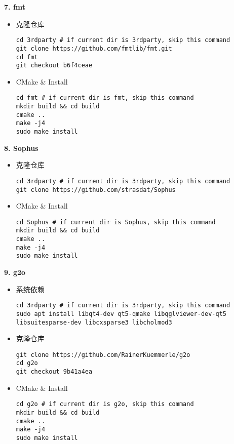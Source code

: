 \noindent \textbf{7. fmt}
\begin{itemize}[itemsep=0.1pt,topsep =2pt]
    \item 克隆仓库
\begin{lstlisting}[style=bash]
cd 3rdparty # if current dir is 3rdparty, skip this command
git clone https://github.com/fmtlib/fmt.git
cd fmt
git checkout b6f4ceae
\end{lstlisting}   
    \item CMake \& Install
\begin{lstlisting}[style=bash]
cd fmt # if current dir is fmt, skip this command
mkdir build && cd build
cmake ..
make -j4
sudo make install
\end{lstlisting}   
\end{itemize}

\noindent \textbf{8. Sophus}
\begin{itemize}[itemsep=0.1pt,topsep =2pt]
    \item 克隆仓库
\begin{lstlisting}[style=bash]
cd 3rdparty # if current dir is 3rdparty, skip this command
git clone https://github.com/strasdat/Sophus
\end{lstlisting}   
    \item CMake \& Install
\begin{lstlisting}[style=bash]
cd Sophus # if current dir is Sophus, skip this command
mkdir build && cd build
cmake ..
make -j4
sudo make install
\end{lstlisting}   
\end{itemize}

\noindent \textbf{9. g2o}
\begin{itemize}[itemsep=0.1pt,topsep =2pt]
    \item 系统依赖
\begin{lstlisting}[style=bash]
cd 3rdparty # if current dir is 3rdparty, skip this command
sudo apt install libqt4-dev qt5-qmake libqglviewer-dev-qt5 libsuitesparse-dev libcxsparse3 libcholmod3
\end{lstlisting}
    \item 克隆仓库
\begin{lstlisting}[style=bash]
git clone https://github.com/RainerKuemmerle/g2o
cd g2o
git checkout 9b41a4ea
\end{lstlisting}   
    \item CMake \& Install
\begin{lstlisting}[style=bash]
cd g2o # if current dir is g2o, skip this command
mkdir build && cd build
cmake ..
make -j4
sudo make install
\end{lstlisting}   
\end{itemize}

